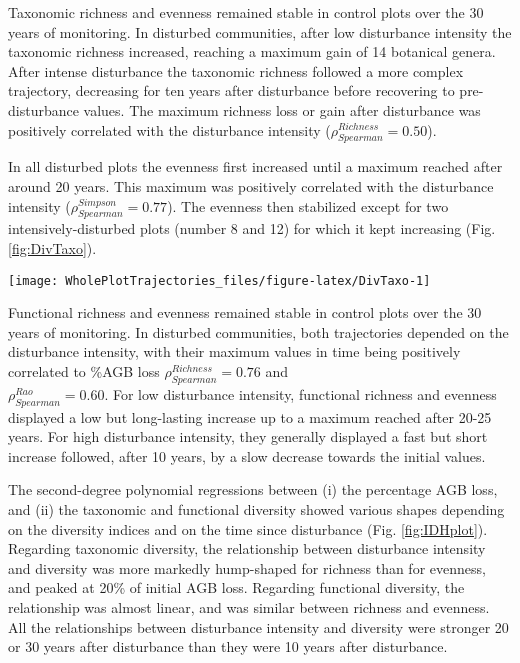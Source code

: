 \documentclass[fleqn,10pt]{ArtEcoFoG} %
\theoremstyle{definition}
\theoremstyle{definition}
\theoremstyle{definition}
\theoremstyle{remark}
\begin{document}
Taxonomic richness and evenness remained stable in control plots over
the 30 years of monitoring. In disturbed communities, after low
disturbance intensity the taxonomic richness increased, reaching a
maximum gain of 14 botanical genera. After intense disturbance the
taxonomic richness followed a more complex trajectory, decreasing for
ten years after disturbance before recovering to pre-disturbance values.
The maximum richness loss or gain after disturbance was positively
correlated with the disturbance intensity
(\(\rho_{Spearman}^{Richness}=0.50\)).

In all disturbed plots the evenness first increased until a maximum
reached after around 20 years. This maximum was positively correlated
with the disturbance intensity (\(\rho_{Spearman}^{Simpson}=0.77\)). The
evenness then stabilized except for two intensively-disturbed plots
(number 8 and 12) for which it kept increasing (Fig. \ref{fig:DivTaxo}).

\begin{figure*}

{\centering \texttt{[image: WholePlotTrajectories\_files/figure-latex/DivTaxo-1]} 

}

\caption{Trajectories of community taxonomic richness \textbf{(a)}, Simpson diversity \textbf{(b)}, functional richness \textbf{(c)}, and Rao diversity \textbf{(d)}. Values correspond to the difference over 30 years of community diversity with the values of 1984 pre-disturbance inventories of reference. Shaded areas are the credibility intervals }\label{fig:DivTaxo}
\end{figure*}

Functional richness and evenness remained stable in control plots over
the 30 years of monitoring. In disturbed communities, both trajectories
depended on the disturbance intensity, with their maximum values in time
being positively correlated to \%AGB loss
\(\rho_{Spearman}^{Richness} = 0.76\) and\\
\(\rho_{Spearman}^{Rao} = 0.60\). For low disturbance intensity,
functional richness and evenness displayed a low but long-lasting
increase up to a maximum reached after 20-25 years. For high disturbance
intensity, they generally displayed a fast but short increase followed,
after 10 years, by a slow decrease towards the initial values.

The second-degree polynomial regressions between (i) the percentage AGB
loss, and (ii) the taxonomic and functional diversity showed various
shapes depending on the diversity indices and on the time since
disturbance (Fig. \ref{fig:IDHplot}). Regarding taxonomic diversity, the
relationship between disturbance intensity and diversity was more
markedly hump-shaped for richness than for evenness, and peaked at 20\%
of initial AGB loss. Regarding functional diversity, the relationship
was almost linear, and was similar between richness and evenness. All
the relationships between disturbance intensity and diversity were
stronger 20 or 30 years after disturbance than they were 10 years after
disturbance.
\end{document}
